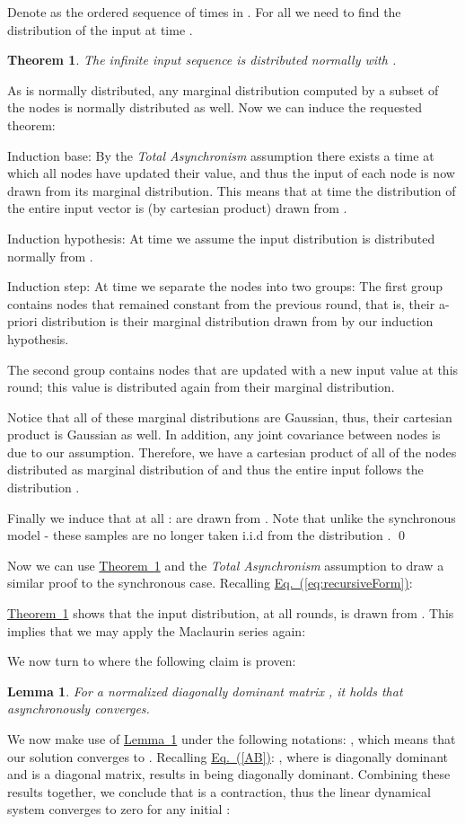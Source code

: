 \documentclass[preprint,12pt]{elsarticle}
\newtheorem{theorem}{Theorem}
\newtheorem{lemma}{Lemma}
\newenvironment{proof}{\noindent{\bf Proof:~~}}{}
\newcommand{\namedref}[2]{\hyperref[#2]{#1~\ref*{#2}}}
\newcommand{\theoremref}[1]{\namedref{Theorem}{#1}}
\newcommand{\lemmaref}[1]{\namedref{Lemma}{#1}}
\newcommand{\namedrefeq}[2]{\hyperref[#2]{#1~\mbox{\rm(\ref*{#2})}}}
\newcommand{\equationref}[1]{\namedrefeq{Eq.}{#1}}
\begin{document}
Denote  as the ordered sequence of times in .
For all  we need to find the distribution of the input at time .
\begin{theorem}\label{theorem:main3}
The infinite input sequence  is distributed normally with .
\end{theorem}
\begin{proof}
As  is normally distributed, any marginal distribution computed by a subset of the nodes is normally distributed as well. Now we can induce the requested theorem:

Induction base: By the {\em Total Asynchronism} assumption there exists a time  at which all nodes have updated their value, and thus the input of each node is now drawn from its marginal distribution. This means that at time  the distribution of the entire input vector is (by cartesian product) drawn from .

Induction hypothesis: At time  we assume the input distribution is distributed normally from .

Induction step: At time  we separate the nodes into two groups:
  The first group contains nodes that remained constant from the previous round, that is, their a-priori distribution is their marginal distribution drawn from  by our induction hypothesis.

  The second group contains nodes that are updated with a new input value at this round; this value is distributed again from their marginal distribution.

  Notice that all of these marginal distributions are Gaussian, thus, their cartesian product is Gaussian as well. In addition, any joint covariance between nodes is  due to our assumption. Therefore, we have a cartesian product of all of the nodes distributed as marginal distribution of  and thus the entire input  follows the distribution .

    Finally we induce that at all :  are drawn from . Note that unlike the synchronous model - these samples are no longer taken i.i.d from the distribution .
\qed\end{proof}

Now we can use \theoremref{theorem:main3} and the {\em Total Asynchronism} assumption to draw a similar proof to the synchronous case. Recalling \equationref{eq:recursiveForm}:

\theoremref{theorem:main3} shows that the input distribution, at all rounds, is drawn from . This implies that we may apply the Maclaurin series again:


We now turn to  \cite[Section 6.3.2]{BT97} where the following claim is proven:
\begin{lemma}\label{claim:contraction}
  For a normalized diagonally dominant matrix , it holds that
   asynchronously converges.
\end{lemma}
We now make use of \lemmaref{claim:contraction} under the following notations: , which means that our solution converges to . Recalling \equationref{AB}: , where  is diagonally dominant and  is a diagonal matrix, results in  being diagonally dominant. Combining these results together, we conclude that  is a contraction, thus the linear dynamical system  converges to zero for any initial :
\end{document}
